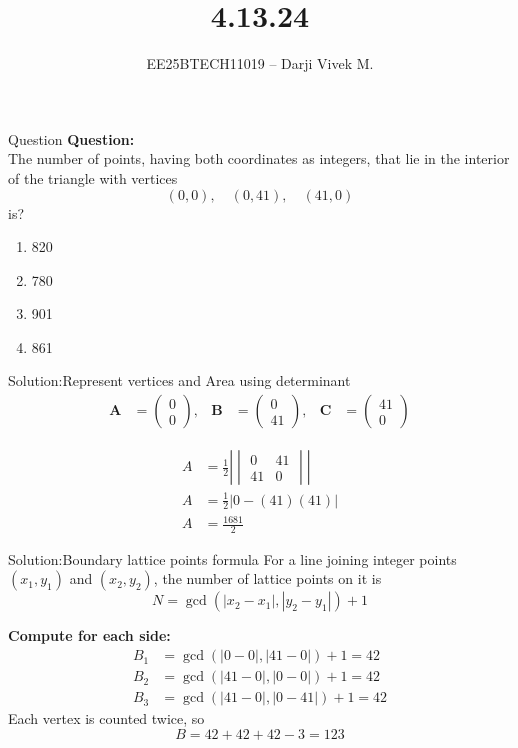 \documentclass{beamer}
\title{4.13.24}
\author{EE25BTECH11019 -- Darji Vivek M.}
\date{}
\newcommand{\myvec}[1]{\begin{pmatrix}#1\end{pmatrix}}
\renewcommand{\vec}[1]{\mathbf{#1}}
\begin{document}
\begin{frame}
\begin{titlepage}

\end{titlepage}
\end{frame}

\begin{frame}{Question}
\textbf{Question:}\\
The number of points, having both coordinates as integers, that lie in the interior of the triangle with vertices 
\[
(0,0), \quad (0,41), \quad (41,0)
\]
is?
\begin{enumerate}
    \item 820
    \item 780
    \item 901
    \item 861
\end{enumerate}
\end{frame}

\begin{frame}{Solution:Represent vertices and Area using determinant}
\begin{align}
\vec{A} &= \myvec{0\\0}, &
\vec{B} &= \myvec{0\\41}, &
\vec{C} &= \myvec{41\\0}
\end{align}

\begin{align}
A &= \frac{1}{2}\left|\begin{vmatrix}0 & 41\\41 & 0\end{vmatrix}\right|\\
A &= \frac{1}{2}\left|0 - (41)(41)\right|\\
A &= \frac{1681}{2}
\end{align}
\end{frame}

\begin{frame}{Solution:Boundary lattice points formula}
For a line joining integer points \((x_1,y_1)\) and \((x_2,y_2)\),  
the number of lattice points on it is
\[
N = \gcd(|x_2-x_1|, |y_2-y_1|) + 1
\]

\textbf{Compute for each side:}
\begin{align}
B_1 &= \gcd(|0-0|, |41-0|) + 1 = 42 \\ 
B_2 &= \gcd(|41-0|, |0-0|) + 1 = 42 \\ 
B_3 &= \gcd(|41-0|, |0-41|) + 1 = 42
\end{align}
Each vertex is counted twice, so
\[
B = 42 + 42 + 42 - 3 = 123
\]
\end{frame}
\end{document}
